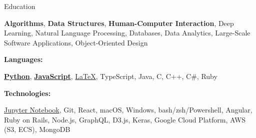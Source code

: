 \documentclass{resume}
\begin{document}
\begin{rSection}{Education}
\begin{adjustwidth}{3.5em}{0pt}
    {\bf Algorithms},
    {\bf Data Structures},
    {\bf Human-Computer Interaction},
    Deep Learning,
    Natural Language Processing,
    Databases,
    Data Analytics,
    Large-Scale Software Applications,
    Object-Oriented Design
    
\end{adjustwidth}


%
%   
%
%
%
\vspace{-0.4em}
{\bf Languages:}
\vspace{-1.83em}
\begin{adjustwidth}{6em}{0pt}
    {\bf \href{https://github.com/jlucasa?tab=repositories&q=&type=&language=python&sort=}{Python}}, 
    {\bf \href{https://github.com/jlucasa?tab=repositories&q=&type=&language=javascript&sort=}{JavaScript}},
    \href{https://github.com/jlucasa?tab=repositories&q=&type=&language=tex&sort=}{\LaTeX},
    TypeScript,
    Java,
    C,
    C++,
    C\#,
    Ruby
\end{adjustwidth}

%
%
%
\vspace{-3pt}
{\bf Technologies:}
\vspace{-1.83em}
\begin{adjustwidth}{7em}{0pt}
    \href{https://github.com/jlucasa?tab=repositories&q=&type=&language=jupyter+notebook&sort=}{Jupyter Notebook},
    Git,
    React,
    macOS,
    Windows,
    bash/zsh/Powershell,
    Angular,
    Ruby on Rails,
    Node.js,
    GraphQL,
    D3.js,
    Keras,
    Google Cloud Platform,
    AWS (S3, ECS),
    MongoDB


\end{adjustwidth}
\end{rSection}
\end{document}
